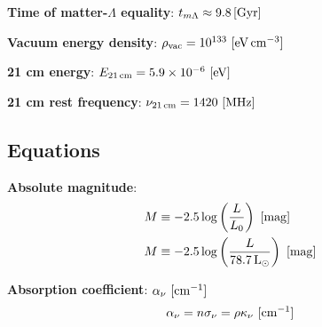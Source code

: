 \documentclass[a4paper,10pt]{article}
\begin{document}
{\noindent}\textbf{Time of matter-$\Lambda$ equality}: $t_{m\Lambda}
\approx9.8\,[{\rm Gyr}]$

{\noindent}\textbf{Vacuum energy density}: $\rho_\mathrm{vac} = 10^{133} ~ [{\rm eV\,cm^{-3}}]$

{\noindent}\textbf{21 cm energy}: $E_{21\,\mathrm{cm}} = 5.9\times10^{-6} ~ [{\rm eV}]$

{\noindent}\textbf{21 cm rest frequency}: $\nu_{21\,\mathrm{cm}} = 1420 ~ [{\rm MHz}]$







































\newpage
\subsection{Equations}

{\noindent}\textbf{Absolute magnitude}:
\begin{align*}
    M &\equiv -2.5\log\left(\frac{L}{L_0}\right) ~ [{\rm mag}] \\
    M &\equiv -2.5\log\left(\frac{L}{78.7\,{\rm L_\odot}}\right) ~ [{\rm mag}]
\end{align*}

{\noindent}\textbf{Absorption coefficient}: $\alpha_\nu ~ [{\rm cm^{-1}}]$
\begin{align*}
    \alpha_\nu = n\sigma_\nu = \rho\kappa_\nu ~ [{\rm cm^{-1}}]
\end{align*}
\end{document}
